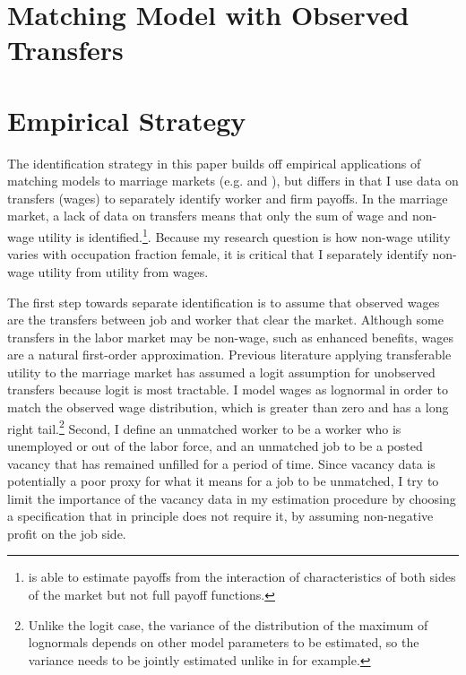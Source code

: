 \documentclass[12pt]{article}
\begin{document}
\section{Matching Model with Observed Transfers} \label{model}

\section{Empirical Strategy} \label{empirical}

The identification strategy in this paper builds off empirical applications of matching models to marriage markets (e.g.  and ), but differs in that I use data on transfers (wages) to separately identify worker and firm payoffs. In the marriage market, a lack of data on transfers means that only the sum of wage and non-wage utility is identified.\footnote{ is able to estimate payoffs from the interaction of characteristics of both sides of the market but not full payoff functions.}. Because my research question is how non-wage utility varies with occupation fraction female, it is critical that I separately identify non-wage utility from utility from wages. 


The first step towards separate identification is to assume that observed wages are the transfers between job and worker that clear the market. Although some transfers in the labor market may be non-wage, such as enhanced benefits, wages are a natural first-order approximation. Previous literature applying transferable utility to the marriage market has assumed a logit assumption for unobserved transfers because logit is most tractable. I model wages as lognormal in order to match the observed wage distribution, which is greater than zero and has a long right tail.\footnote{Unlike the logit case, the variance of the distribution of the maximum of lognormals depends on other model parameters to be estimated, so the variance needs to be jointly estimated unlike in  for example.} Second, I define an unmatched worker to be a worker who is unemployed or out of the labor force, and an unmatched job to be a posted vacancy that has remained unfilled for a period of time. Since vacancy data is potentially a poor proxy for what it means for a job to be unmatched, I try to limit the importance of the vacancy data in my estimation procedure by choosing a specification that in principle does not require it, by assuming non-negative profit on the job side. 
\end{document}
